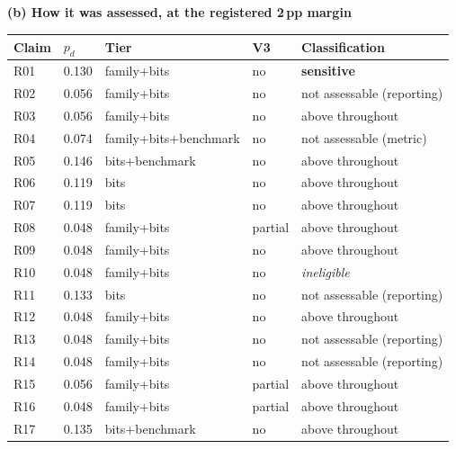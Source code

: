 \begin{table}[!tp]
\smallskip
\textbf{(b) How it was assessed, at the registered 2\,pp margin}\par\smallskip
\begin{tabular}{@{}lllll@{}}
\toprule
Claim & $p_d$ & Tier & V3 & Classification \\
\midrule
R01 & 0.130 & family+bits & no & \textbf{sensitive} \\
R02 & 0.056 & family+bits & no & not assessable (reporting) \\
R03 & 0.056 & family+bits & no & above throughout \\
R04 & 0.074 & family+bits+benchmark & no & not assessable (metric) \\
R05 & 0.146 & bits+benchmark & no & above throughout \\
R06 & 0.119 & bits & no & above throughout \\
R07 & 0.119 & bits & no & above throughout \\
R08 & 0.048 & family+bits & partial & above throughout \\
R09 & 0.048 & family+bits & no & above throughout \\
R10 & 0.048 & family+bits & no & \emph{ineligible} \\
R11 & 0.133 & bits & no & not assessable (reporting) \\
R12 & 0.048 & family+bits & no & above throughout \\
R13 & 0.048 & family+bits & no & not assessable (reporting) \\
R14 & 0.048 & family+bits & no & not assessable (reporting) \\
R15 & 0.056 & family+bits & partial & above throughout \\
R16 & 0.048 & family+bits & partial & above throughout \\
R17 & 0.135 & bits+benchmark & no & above throughout \\
\bottomrule
\end{tabular}
\end{table}

